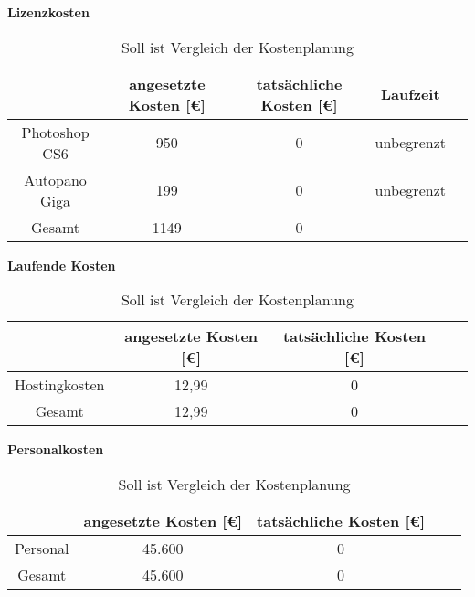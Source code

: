 \textbf{Lizenzkosten}

\begin{table}[h]
\centering
\begin{tabular}{ccccl}
\hline
\multicolumn{1}{l}{}      & angesetzte Kosten {[}€{]} & tatsächliche Kosten {[}€{]} &  Laufzeit \\ \hline
Photoshop CS6             & 950\footnotemark[7]       & 0                           &  unbegrenzt  \\ \hline
Autopano Giga             & 199\footnotemark[8]       & 0                           &  unbegrenzt  \\ \hline

Gesamt                    & 1149           & 0                    \\ \hline
\end{tabular}
\caption{Soll ist Vergleich der Kostenplanung}%
\label{tab:KostenaufstellungLizenzen}%
\end{table}



\textbf{Laufende Kosten}

\begin{table}[h]
\centering
\begin{tabular}{ccccl}
\hline
\multicolumn{1}{l}{}      & angesetzte Kosten {[}€{]} & tatsächliche Kosten {[}€{]} \\ \hline
Hostingkosten             & 12,99\footnotemark[9]       & 0                         \\ \hline

Gesamt                    & 12,99           & 0                    \\ \hline
\end{tabular}
\caption{Soll ist Vergleich der Kostenplanung}%
\label{tab:KostenaufstellungLizenzen}%
\end{table}



\textbf{Personalkosten}

\begin{table}[h]
\centering
\begin{tabular}{ccccl}
\hline
\multicolumn{1}{l}{}      & angesetzte Kosten {[}€{]} & tatsächliche Kosten {[}€{]} \\ \hline
Personal                  & 45.600\footnotemark[10]    & 0                         \\ \hline

Gesamt                    & 45.600           & 0                    \\ \hline
\end{tabular}
\caption{Soll ist Vergleich der Kostenplanung}%
\label{tab:KostenaufstellungLizenzen}%
\end{table}

